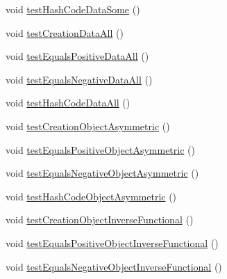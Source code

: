 \begin{DoxyCompactItemize}
void \hyperlink{classorg_1_1semanticweb_1_1owlapi_1_1datafactory_1_1_o_w_l_data_factory_test_case_a7dbc61d729bc03f94baa587890cb93b9}{test\-Hash\-Code\-Data\-Some} ()
\item 
void \hyperlink{classorg_1_1semanticweb_1_1owlapi_1_1datafactory_1_1_o_w_l_data_factory_test_case_abc176d1e22b825f1b8df53d449a2961c}{test\-Creation\-Data\-All} ()
\item 
void \hyperlink{classorg_1_1semanticweb_1_1owlapi_1_1datafactory_1_1_o_w_l_data_factory_test_case_a0c99782e3b2029b70f740e59af4169f7}{test\-Equals\-Positive\-Data\-All} ()
\item 
void \hyperlink{classorg_1_1semanticweb_1_1owlapi_1_1datafactory_1_1_o_w_l_data_factory_test_case_aa43574b70f2a9b4a1c6840206db54db3}{test\-Equals\-Negative\-Data\-All} ()
\item 
void \hyperlink{classorg_1_1semanticweb_1_1owlapi_1_1datafactory_1_1_o_w_l_data_factory_test_case_a6c1fdf590052952f2e72cc09439f26f7}{test\-Hash\-Code\-Data\-All} ()
\item 
void \hyperlink{classorg_1_1semanticweb_1_1owlapi_1_1datafactory_1_1_o_w_l_data_factory_test_case_a7aee409e37608fab7c52d90fc36c9a4d}{test\-Creation\-Object\-Asymmetric} ()
\item 
void \hyperlink{classorg_1_1semanticweb_1_1owlapi_1_1datafactory_1_1_o_w_l_data_factory_test_case_abac930234e95a96bad8503851561d3c9}{test\-Equals\-Positive\-Object\-Asymmetric} ()
\item 
void \hyperlink{classorg_1_1semanticweb_1_1owlapi_1_1datafactory_1_1_o_w_l_data_factory_test_case_aad8c0924c582d766917c81011020fb3b}{test\-Equals\-Negative\-Object\-Asymmetric} ()
\item 
void \hyperlink{classorg_1_1semanticweb_1_1owlapi_1_1datafactory_1_1_o_w_l_data_factory_test_case_a05156b01b6a70f94fd18c18da54c957e}{test\-Hash\-Code\-Object\-Asymmetric} ()
\item 
void \hyperlink{classorg_1_1semanticweb_1_1owlapi_1_1datafactory_1_1_o_w_l_data_factory_test_case_ae1d54c770b5f68a3e9ba434914975456}{test\-Creation\-Object\-Inverse\-Functional} ()
\item 
void \hyperlink{classorg_1_1semanticweb_1_1owlapi_1_1datafactory_1_1_o_w_l_data_factory_test_case_a240d79d6605b8600862fa5817cc711b3}{test\-Equals\-Positive\-Object\-Inverse\-Functional} ()
\item 
void \hyperlink{classorg_1_1semanticweb_1_1owlapi_1_1datafactory_1_1_o_w_l_data_factory_test_case_abd3e06e302b14c35cc0f605580101081}{test\-Equals\-Negative\-Object\-Inverse\-Functional} ()

\end{DoxyCompactItemize}
